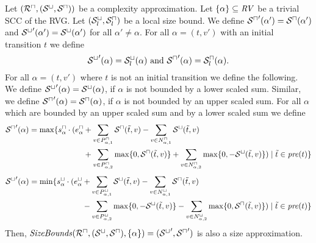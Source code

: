 \begin{theorem}
  Let $({\mathcal{R}^\sqcap}, {({\mathcal{S}^\sqcup}, {\mathcal{S}^\sqcap})})$ be a complexity approximation.
  Let $\lbrace \alpha \rbrace \subseteq \mathit{RV}$ be a trivial SCC of the RVG.
  Let ${({\mathcal{S}^\sqcup_l}, {\mathcal{S}^\sqcap_l})}$ be a local size bound.
  We define ${\mathcal{S}^\sqcap}'(\alpha') = {\mathcal{S}^\sqcap}(\alpha')$ and ${\mathcal{S}^\sqcup}'(\alpha') = {\mathcal{S}^\sqcup}(\alpha')$ for all $\alpha' \neq \alpha$.
  For all $\alpha = (t, v')$ with an initial transition $t$ we define
  \[ {\mathcal{S}^\sqcup}'(\alpha) = {\mathcal{S}^\sqcup_l}(\alpha) \text{ and } {\mathcal{S}^\sqcap}'(\alpha) = {\mathcal{S}^\sqcap_l}(\alpha). \]
  For all $\alpha = (t, v')$ where $t$ is not an initial transition we define the following.
  We define ${\mathcal{S}^\sqcup}'(\alpha) = {\mathcal{S}^\sqcup}(\alpha)$, if $\alpha$ is not bounded by a lower scaled sum.
  Similar, we define ${\mathcal{S}^\sqcap}'(\alpha) = {\mathcal{S}^\sqcap}(\alpha)$, if $\alpha$ is not bounded by an upper scaled sum.
  For all $\alpha$ which are bounded by an upper scaled sum and by a lower scaled sum we define 
  \begin{equation}
    \begin{split}
      {\mathcal{S}^\sqcap}'(\alpha) = \max \lbrace  s^\sqcap_\alpha \cdot ( e^\sqcap_\alpha & + \sum_{v \in P_{\alpha,1}^\sqcap} {\mathcal{S}^\sqcap}(\tilde{t}, v) - \sum_{v \in N_{\alpha,1}^\sqcap} {\mathcal{S}^\sqcup}(\tilde{t}, v) \\
        & + \sum_{v \in P_{\alpha,2}^\sqcap} \max \lbrace 0,{\mathcal{S}^\sqcap}(\tilde{t}, v) \rbrace + \sum_{v \in N_{\alpha,2}^\sqcap} \max \lbrace 0,-{\mathcal{S}^\sqcup}(\tilde{t}, v) \rbrace ) \mid \tilde{t} \in \mathit{pre}(t) \rbrace
    \end{split}
  \end{equation}
  \begin{equation}
    \begin{split}
      {\mathcal{S}^\sqcup}'(\alpha) = \min \lbrace  s^\sqcup_\alpha \cdot ( e^\sqcup_\alpha & + \sum_{v \in P_{\alpha,1}^\sqcup} {\mathcal{S}^\sqcup}(\tilde{t}, v) - \sum_{v \in N_{\alpha,1}^\sqcup} {\mathcal{S}^\sqcap}(\tilde{t}, v) \\
        & - \sum_{v \in P_{\alpha,2}^\sqcup} \max \lbrace 0,-{\mathcal{S}^\sqcup}(\tilde{t}, v) \rbrace - \sum_{v \in N_{\alpha,2}^\sqcup} \max \lbrace 0,{\mathcal{S}^\sqcap}(\tilde{t}, v) \rbrace ) \mid \tilde{t} \in \mathit{pre}(t) \rbrace
    \end{split}
  \end{equation}
  Then, $\mathit{SizeBounds}({\mathcal{R}^\sqcap}, {({\mathcal{S}^\sqcup}, {\mathcal{S}^\sqcap})}, \lbrace \alpha \rbrace) = ({\mathcal{S}^\sqcup}', {\mathcal{S}^\sqcap}')$ is also a size approximation.
\end{theorem}
